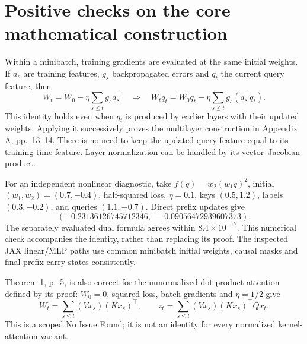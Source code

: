 \documentclass[10pt]{article}
\begin{document}
\section*{Positive checks on the core mathematical construction}
Within a minibatch, training gradients are evaluated at the same initial weights. If \(a_s\) are training features, \(g_s\) backpropagated errors and \(q_t\) the current query feature, then \[W_t=W_0-\eta\sum_{s\le t}g_sa_s^\top
 \quad\Longrightarrow\quad
 W_tq_t=W_0q_t-\eta\sum_{s\le t}g_s(a_s^\top q_t).\] This identity holds even when \(q_t\) is produced by earlier layers with their updated weights. Applying it successively proves the multilayer construction in Appendix A, pp. 13–14. There is no need to keep the updated query feature equal to its training-time feature. Layer normalization can be handled by its vector–Jacobian product.\par
For an independent nonlinear diagnostic, take \(f(q)=w_2(w_1q)^2\), initial \((w_1,w_2)=(0.7,-0.4)\), half-squared loss, \(\eta=0.1\), keys \((0.5,1.2)\), labels \((0.3,-0.2)\), and queries \((1.1,-0.7)\). Direct prefix updates give \[(-0.23136126745712346,\;-0.09056472939607373).\] The separately evaluated dual formula agrees within \(8.4\times10^{-17}\). This numerical check accompanies the identity, rather than replacing its proof. The inspected JAX linear/MLP paths use common minibatch initial weights, causal masks and final-prefix carry states consistently.\par
Theorem 1, p. 5, is also correct for the unnormalized dot-product attention defined by its proof: \(W_0=0\), squared loss, batch gradients and \(\eta=1/2\) give \[W_t=\sum_{s\le t}(Vx_s)(Kx_s)^\top,\qquad
 z_t=\sum_{s\le t}(Vx_s)(Kx_s)^\top Qx_t.\] This is a scoped No Issue Found; it is not an identity for every normalized kernel-attention variant.\par
\end{document}
